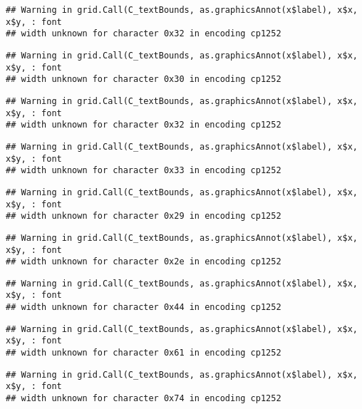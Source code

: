 \documentclass[
]{article}
\begin{document}
\begin{verbatim}
## Warning in grid.Call(C_textBounds, as.graphicsAnnot(x$label), x$x, x$y, : font
## width unknown for character 0x32 in encoding cp1252
\end{verbatim}

\begin{verbatim}
## Warning in grid.Call(C_textBounds, as.graphicsAnnot(x$label), x$x, x$y, : font
## width unknown for character 0x30 in encoding cp1252
\end{verbatim}

\begin{verbatim}
## Warning in grid.Call(C_textBounds, as.graphicsAnnot(x$label), x$x, x$y, : font
## width unknown for character 0x32 in encoding cp1252
\end{verbatim}

\begin{verbatim}
## Warning in grid.Call(C_textBounds, as.graphicsAnnot(x$label), x$x, x$y, : font
## width unknown for character 0x33 in encoding cp1252
\end{verbatim}

\begin{verbatim}
## Warning in grid.Call(C_textBounds, as.graphicsAnnot(x$label), x$x, x$y, : font
## width unknown for character 0x29 in encoding cp1252
\end{verbatim}

\begin{verbatim}
## Warning in grid.Call(C_textBounds, as.graphicsAnnot(x$label), x$x, x$y, : font
## width unknown for character 0x2e in encoding cp1252
\end{verbatim}

\begin{verbatim}
## Warning in grid.Call(C_textBounds, as.graphicsAnnot(x$label), x$x, x$y, : font
## width unknown for character 0x44 in encoding cp1252
\end{verbatim}

\begin{verbatim}
## Warning in grid.Call(C_textBounds, as.graphicsAnnot(x$label), x$x, x$y, : font
## width unknown for character 0x61 in encoding cp1252
\end{verbatim}

\begin{verbatim}
## Warning in grid.Call(C_textBounds, as.graphicsAnnot(x$label), x$x, x$y, : font
## width unknown for character 0x74 in encoding cp1252
\end{verbatim}
\end{document}
